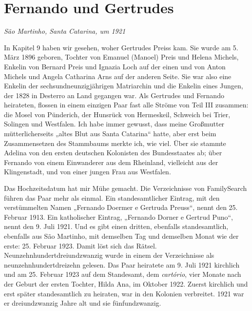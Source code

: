 \documentclass[
  ngerman,
  11pt,
  openany]{book}
\begin{document}
\section{Fernando und Gertrudes}\label{fernando-und-gertrudes}

\emph{São Martinho, Santa Catarina, um 1921}

In Kapitel 9 haben wir gesehen, woher Gertrudes Preiss kam. Sie wurde am
5. März 1896 geboren, Tochter von Emanuel (Manoel) Preis und Helena
Michels, Enkelin von Bernard Preis und Ignazia Loch auf der einen und
von Anton Michels und Angela Catharina Arns auf der anderen Seite. Sie
war also eine Enkelin der sechsundneunzigjährigen Matriarchin und die
Enkelin eines Jungen, der 1828 in Desterro an Land gegangen war. Als
Gertrudes und Fernando heirateten, flossen in einem einzigen Paar fast
alle Ströme von Teil III zusammen: die Mosel von Pünderich, der Hunsrück
von Hermeskeil, Schweich bei Trier, Solingen und Westfalen. Ich habe
immer gewusst, dass meine Großmutter mütterlicherseits „altes Blut aus
Santa Catarina`` hatte, aber erst beim Zusammensetzen des Stammbaums
merkte ich, wie viel. Über sie stammte Adelina von den ersten deutschen
Kolonisten des Bundesstaates ab; über Fernando von einem Einwanderer aus
dem Rheinland, vielleicht aus der Klingenstadt, und von einer jungen
Frau aus Westfalen.

Das Hochzeitsdatum hat mir Mühe gemacht. Die Verzeichnisse von
FamilySearch führen das Paar mehr als einmal. Ein standesamtlicher
Eintrag, mit den verstümmelten Namen „Fernando Doermer e Gertruda
Preuss``, nennt den 25. Februar 1913. Ein katholischer Eintrag,
„Fernando Dorner e Gertrud Puno``, nennt den 9. Juli 1921. Und es gibt
einen dritten, ebenfalls standesamtlich, ebenfalls aus São Martinho, mit
demselben Tag und demselben Monat wie der erste: 25. Februar 1923. Damit
löst sich das Rätsel. Neunzehnhundertdreiundzwanzig wurde in einem der
Verzeichnisse als neunzehnhundertdreizehn gelesen. Das Paar heiratete am
9. Juli 1921 kirchlich und am 25. Februar 1923 auf dem Standesamt, dem
\emph{cartório}, vier Monate nach der Geburt der ersten Tochter, Hilda
Ana, im Oktober 1922. Zuerst kirchlich und erst später standesamtlich zu
heiraten, war in den Kolonien verbreitet. 1921 war er dreiundzwanzig
Jahre alt und sie fünfundzwanzig.
\end{document}

